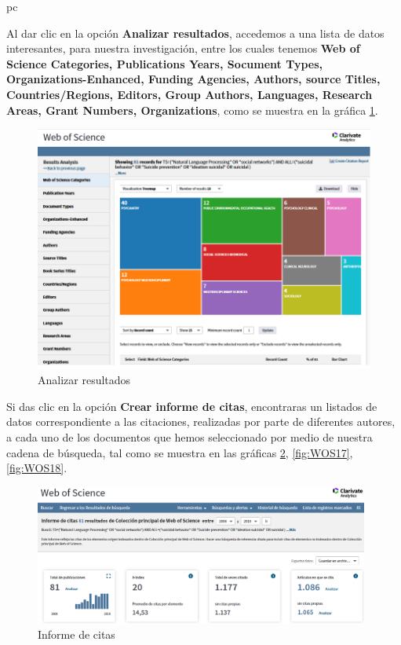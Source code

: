 pc\documentclass[a4paper,12pt,openany]{book}
\begin{document}
\begin{itemize}
Al dar clic en la opción \textbf{Analizar resultados}, accedemos a una lista de datos interesantes, para nuestra investigación, entre los cuales tenemos \textbf{Web of Science Categories, Publications Years, Socument Types, Organizations-Enhanced, Funding Agencies, Authors, source Titles, Countries/Regions, Editors, Group Authors, Languages, Research Areas, Grant Numbers, Organizations}, como se muestra en la gráfica \ref{fig:WOS15}. 

    \begin{figure}[H]
    \centering
	\includegraphics[width=12cm]{Wos15.png}
    \caption{Analizar resultados}
    \label{fig:WOS15}
    \end{figure}

Si das clic en la opción \textbf{Crear informe de citas}, encontraras un listados de datos correspondiente a las citaciones, realizadas por parte de diferentes autores, a cada uno de los documentos que hemos seleccionado por medio de nuestra cadena de  búsqueda, tal como se muestra en las gráficas \ref{fig:WOS16}, \ref{fig:WOS17}, \ref{fig:WOS18}. 

    \begin{figure}[H]
    \centering
	\includegraphics[width=11cm]{Wos16.png}
    \caption{Informe de citas}
    \label{fig:WOS16}
    \end{figure}


\end{itemize}
\end{document}
